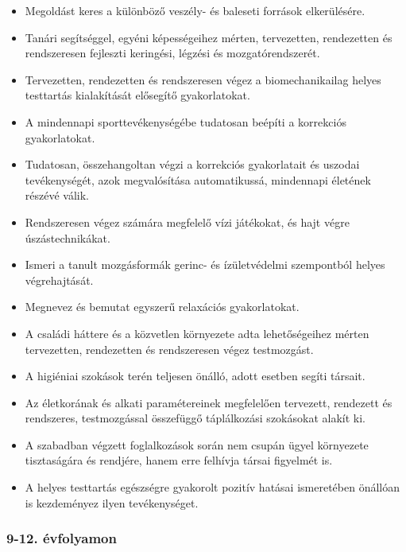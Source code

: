 \begin{itemize}
\item
  Megoldást keres a különböző veszély- és baleseti források
  elkerülésére.
\item
  Tanári segítséggel, egyéni képességeihez mérten, tervezetten,
  rendezetten és rendszeresen fejleszti keringési, légzési és
  mozgatórendszerét.
\item
  Tervezetten, rendezetten és rendszeresen végez a biomechanikailag
  helyes testtartás kialakítását elősegítő gyakorlatokat.
\item
  A mindennapi sporttevékenységébe tudatosan beépíti a korrekciós
  gyakorlatokat.
\item
  Tudatosan, összehangoltan végzi a korrekciós gyakorlatait és uszodai
  tevékenységét, azok megvalósítása automatikussá, mindennapi életének
  részévé válik.
\item
  Rendszeresen végez számára megfelelő vízi játékokat, és hajt végre
  úszástechnikákat.
\item
  Ismeri a tanult mozgásformák gerinc- és ízületvédelmi szempontból
  helyes végrehajtását.
\item
  Megnevez és bemutat egyszerű relaxációs gyakorlatokat.
\item
  A családi háttere és a közvetlen környezete adta lehetőségeihez mérten
  tervezetten, rendezetten és rendszeresen végez testmozgást.
\item
  A higiéniai szokások terén teljesen önálló, adott esetben segíti
  társait.
\item
  Az életkorának és alkati paramétereinek megfelelően tervezett,
  rendezett és rendszeres, testmozgással összefüggő táplálkozási
  szokásokat alakít ki.
\item
  A szabadban végzett foglalkozások során nem csupán ügyel környezete
  tisztaságára és rendjére, hanem erre felhívja társai figyelmét is.
\item
  A helyes testtartás egészségre gyakorolt pozitív hatásai ismeretében
  önállóan is kezdeményez ilyen tevékenységet.
\end{itemize}

\hypertarget{evfolyamon-35}{%
\subsubsection{9-12. évfolyamon}\label{evfolyamon-35}}

